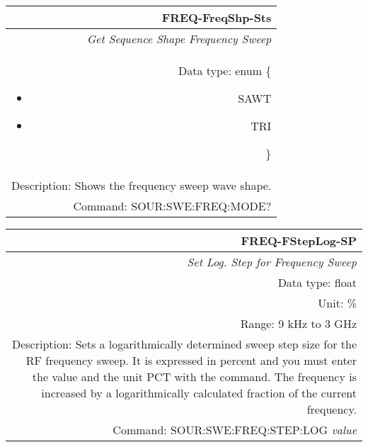 \documentclass[openany]{article}
\begin{document}
		\begin{tabular}{N}
			\hline
			\bfseries FREQ-FreqShp-Sts \\ \hline
			\emph{Get Sequence Shape Frequency Sweep} \\
			Data type: enum \{\begin{itemize}[noitemsep]
				\small
				\item[] SAWT
				\item[] TRI
			\end{itemize}\} \\
			Description: Shows the frequency sweep wave shape. \\
			Command: SOUR:SWE:FREQ:MODE? \\

		\end{tabular}
%
		\begin{tabular}{N}
			\hline
			\bfseries FREQ-FStepLog-SP \\ \hline
			\emph{Set Log. Step for Frequency Sweep} \\
			Data type: float \\
			Unit: \% \\
			Range: 9 kHz to 3 GHz \\
			Description: Sets a logarithmically determined sweep step size for the RF frequency sweep. It is expressed in percent and you must enter the value and the unit PCT with the command. The frequency is increased by a logarithmically calculated fraction of the current frequency. \\
			Command: SOUR:SWE:FREQ:STEP:LOG \emph{value} \\
			
		\end{tabular}
\end{document}
